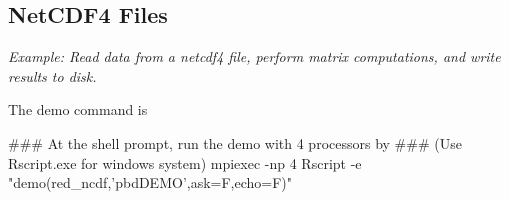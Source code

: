 
\subsection{NetCDF4 Files}

\emph{Example:  Read data from a netcdf4 file, perform matrix computations, and write results to disk.}

The demo command is
\begin{Command}
### At the shell prompt, run the demo with 4 processors by
### (Use Rscript.exe for windows system)
mpiexec -np 4 Rscript -e "demo(red_ncdf,'pbdDEMO',ask=F,echo=F)"
\end{Command}



\begin{center}
{\Huge \color{red}{WORK IN PROGRESS}} 
\end{center}







